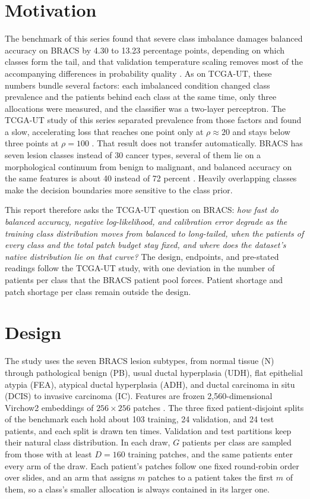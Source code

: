 \documentclass[11pt]{article}
\begin{document}
\section{Motivation}
\label{sec:motivation}
The benchmark of this series found that severe class imbalance damages balanced accuracy on BRACS by 4.30 to 13.23 percentage points, depending on which classes form the tail, and that validation temperature scaling removes most of the accompanying differences in probability quality \citep{queisler2026benchmarkResults,queisler2026benchmarkProtocol}. As on TCGA-UT, these numbers bundle several factors: each imbalanced condition changed class prevalence and the patients behind each class at the same time, only three allocations were measured, and the classifier was a two-layer perceptron. The TCGA-UT study of this series separated prevalence from those factors and found a slow, accelerating loss that reaches one point only at $\rho\approx20$ and stays below three points at $\rho=100$ \citep{queisler2026prevalenceTcga}. That result does not transfer automatically. BRACS has seven lesion classes instead of 30 cancer types, several of them lie on a morphological continuum from benign to malignant, and balanced accuracy on the same features is about 40 instead of 72 percent \citep{queisler2026bracsMechanism}. Heavily overlapping classes make the decision boundaries more sensitive to the class prior.

This report therefore asks the TCGA-UT question on BRACS: \emph{how fast do balanced accuracy, negative log-likelihood, and calibration error degrade as the training class distribution moves from balanced to long-tailed, when the patients of every class and the total patch budget stay fixed, and where does the dataset's native distribution lie on that curve?} The design, endpoints, and pre-stated readings follow the TCGA-UT study, with one deviation in the number of patients per class that the BRACS patient pool forces. Patient shortage and patch shortage per class remain outside the design.

\section{Design}
\label{sec:design}
The study uses the seven BRACS lesion subtypes, from normal tissue (N) through pathological benign (PB), usual ductal hyperplasia (UDH), flat epithelial atypia (FEA), atypical ductal hyperplasia (ADH), and ductal carcinoma in situ (DCIS) to invasive carcinoma (IC). Features are frozen 2,560-dimensional Virchow2 embeddings of $256\times256$ patches \citep{zimmermann2024virchow2}. The three fixed patient-disjoint splits of the benchmark each hold about 103 training, 24 validation, and 24 test patients, and each split is drawn ten times. Validation and test partitions keep their natural class distribution. In each draw, $G$ patients per class are sampled from those with at least $D=160$ training patches, and the same patients enter every arm of the draw. Each patient's patches follow one fixed round-robin order over slides, and an arm that assigns $m$ patches to a patient takes the first $m$ of them, so a class's smaller allocation is always contained in its larger one.
\end{document}

